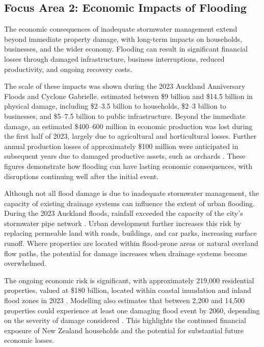 \documentclass[11pt,a4paper]{article}
\begin{document}
\subsection{Focus Area 2: Economic Impacts of Flooding}

The economic consequences of inadequate stormwater management extend beyond immediate property damage, with long-term impacts on households, businesses, and the wider economy. Flooding can result in significant financial losses through damaged infrastructure, business interruptions, reduced productivity, and ongoing recovery costs.

The scale of these impacts was shown during the 2023 Auckland Anniversary Floods and Cyclone Gabrielle. \citet{treasury2023} estimated between \$9 billion and \$14.5 billion in physical damage, including \$2--3.5 billion to households, \$2--3 billion to businesses, and \$5--7.5 billion to public infrastructure. Beyond the immediate damage, an estimated \$400--600 million in economic production was lost during the first half of 2023, largely due to agricultural and horticultural losses. Further annual production losses of approximately \$100 million were anticipated in subsequent years due to damaged productive assets, such as orchards \citep{treasury2023}. These figures demonstrate how flooding can have lasting economic consequences, with disruptions continuing well after the initial event.

Although not all flood damage is due to inadequate stormwater management, the capacity of existing drainage systems can influence the extent of urban flooding. During the 2023 Auckland floods, rainfall exceeded the capacity of the city's stormwater pipe network \citep{akl_council2023}. Urban development further increases this risk by replacing permeable land with roads, buildings, and car parks, increasing surface runoff. Where properties are located within flood-prone areas or natural overland flow paths, the potential for damage increases when drainage systems become overwhelmed.

The ongoing economic risk is significant, with approximately 219,000 residential properties, valued at \$180 billion, located within coastal inundation and inland flood zones in 2023 \citep{mfe_stats2025_marine}. Modelling also estimates that between 2,200 and 14,500 properties could experience at least one damaging flood event by 2060, depending on the severity of damage considered \citep{mfe2025_flood}. This highlights the continued financial exposure of New Zealand households and the potential for substantial future economic losses.
\end{document}
